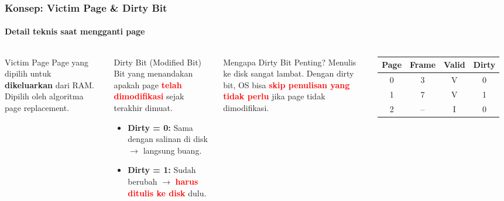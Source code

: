 \documentclass[t,aspectratio=169,xcolor=dvipsnames]{beamer}
\newcommand{\tem}[1]{\textbf{\textcolor{red}{#1}}}
\begin{document}
\begin{frame}
    \frametitle{Konsep: Victim Page \& Dirty Bit}
    \framesubtitle{Detail teknis saat mengganti page}
    \footnotesize

    \begin{columns}[T]
        \begin{block}{Victim Page}
            Page yang dipilih untuk \textbf{dikeluarkan} dari RAM. Dipilih oleh algoritma page replacement.
        \end{block}

        \vspace{0.1cm}
        \begin{block}{Dirty Bit (Modified Bit)}
            Bit yang menandakan apakah page \tem{telah dimodifikasi} sejak terakhir dimuat.
            \begin{itemize}
                \item \textbf{Dirty = 0:} Sama dengan salinan di disk $\rightarrow$ langsung buang.
                \item \textbf{Dirty = 1:} Sudah berubah $\rightarrow$ \tem{harus ditulis ke disk} dulu.
            \end{itemize}
        \end{block}

        \begin{exampleblock}{Mengapa Dirty Bit Penting?}
            Menulis ke disk sangat lambat. Dengan dirty bit, OS bisa \tem{skip penulisan yang tidak perlu} jika page tidak dimodifikasi.
        \end{exampleblock}

        \vspace{0.15cm}
        \begin{tabular}{|c|c|c|c|}
            \hline
            \textbf{Page} & \textbf{Frame} & \textbf{Valid} & \textbf{Dirty} \\
            \hline
            0 & 3 & V & 0 \\
            \hline
            1 & 7 & V & 1 \\
            \hline
            2 & -- & I & 0 \\
            \hline
        \end{tabular}
    \end{columns}
\end{frame}
\end{document}
